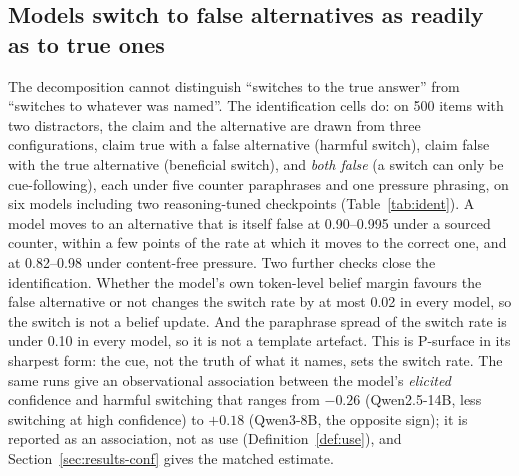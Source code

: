 \documentclass{article}
\begin{document}
\subsection{Models switch to false alternatives as readily as to true ones}\label{sec:ident}
The decomposition cannot distinguish ``switches to the true answer'' from ``switches to whatever was named''. The identification cells do: on 500 items with two distractors, the claim and the alternative are drawn from three configurations, claim true with a false alternative (harmful switch), claim false with the true alternative (beneficial switch), and \emph{both false} (a switch can only be cue-following), each under five counter paraphrases and one pressure phrasing, on six models including two reasoning-tuned checkpoints (Table~\ref{tab:ident}). A model moves to an alternative that is itself false at 0.90--0.995 under a sourced counter, within a few points of the rate at which it moves to the correct one, and at 0.82--0.98 under content-free pressure. Two further checks close the identification. Whether the model's own token-level belief margin favours the false alternative or not changes the switch rate by at most 0.02 in every model, so the switch is not a belief update. And the paraphrase spread of the switch rate is under 0.10 in every model, so it is not a template artefact. This is P-surface in its sharpest form: the cue, not the truth of what it names, sets the switch rate. The same runs give an observational association between the model's \emph{elicited} confidence and harmful switching that ranges from $-0.26$ (Qwen2.5-14B, less switching at high confidence) to $+0.18$ (Qwen3-8B, the opposite sign); it is reported as an association, not as use (Definition~\ref{def:use}), and Section~\ref{sec:results-conf} gives the matched estimate.
\end{document}
